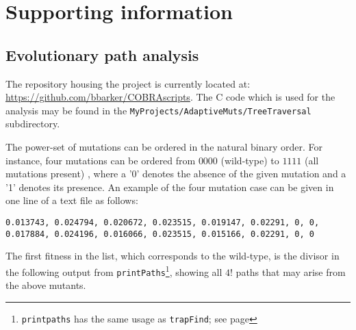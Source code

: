 \section{Supporting information}

\subsection{Evolutionary path analysis}
\label{sec:pathAnalysis}

The repository housing the project is currently located at:
\url{https://github.com/bbarker/COBRAscripts}. The C code which is
used for the analysis may be found in the
\texttt{MyProjects/AdaptiveMuts/TreeTraversal} subdirectory. 


%
%

The power-set of mutations can be ordered in the natural binary order.
For instance, four mutations can be ordered from $0000$ (wild-type) to
$1111$ (all mutations present) , where a '0' denotes the absence of
the given mutation and a '1' denotes its presence. An example of the
four mutation case can be given in one line of a text file as follows:

\vspace{1ex}
\noindent
\texttt{0.013743, 0.024794, 0.020672, 0.023515, 0.019147, 0.02291, 0,
0, 0.017884, 0.024196, 0.016066, 0.023515, 0.015166, 0.02291, 0, 0}
\vspace{1ex}


The first fitness in the list, which corresponds to the wild-type, is
the divisor in the following output from
\texttt{printPaths}\footnote{\texttt{printpaths} has the same usage as
\texttt{trapFind}; see page \pageref{trapFindCmd}}, showing all $4!$
paths that may arise from the above mutants.

